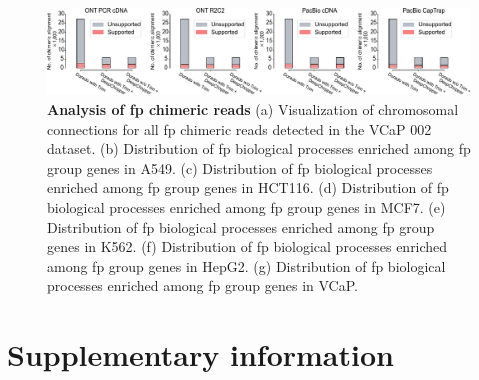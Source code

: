 \documentclass[pdflatex, sn-mathphys-num, lineno]{sn-jnl}%
\theoremstyle{thmstyleone}%
\theoremstyle{thmstyletwo}%
\theoremstyle{thmstylethree}%
\begin{document}
 \begin{figure}[!h]
     \includegraphics[height=1.2\columnwidth]{figures/finals/sf2}
     \caption{ {\bf  Analysis of \gls{fp} chimeric reads } (a) Visualization of chromosomal connections for all \gls{fp} chimeric reads detected in the VCaP 002 dataset. (b) Distribution of \gls{fp} biological processes enriched among \gls{fp} group genes in A549. (c) Distribution of \gls{fp} biological processes enriched among \gls{fp} group genes in HCT116. (d) Distribution of \gls{fp} biological processes enriched among \gls{fp} group genes in MCF7. (e) Distribution of \gls{fp} biological processes enriched among \gls{fp} group genes in K562. (f) Distribution of \gls{fp} biological processes enriched among \gls{fp} group genes in HepG2. (g) Distribution of \gls{fp} biological processes enriched among \gls{fp} group genes in VCaP.}
     \label{fig:sf2}
 \end{figure}


\newpage

\section{Supplementary information}
\end{document}
